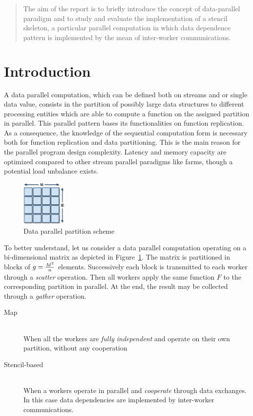 \begin{abstract}
  The aim of the report is to briefly introduce the concept of
  data-parallel paradigm and to study and evaluate the implementation of
  a stencil skeleton, a particular parallel computation in which data
  dependence pattern is implemented by the mean of inter-worker
  communications.
\end{abstract}

\section{Introduction}

A data parallel computation, which can be defined both on streams and or
single data value, consists in the partition of possibly large data
structures to different processing entities which are able to compute
a function on the assigned partition in parallel. This parallel pattern
bases its functionalities on function replication. As a consequence, the
knowledge of the sequential computation form is necessary both for
function replication and data partitioning. This is the main reason for
the parallel program design complexity. Latency and memory capacity are
optimized compared to other stream parallel paradigms like farms, though
a potential load unbalance exists.

\begin{figure}
  \centering
  \includegraphics[width=0.2\textwidth]{imgs/stencil.png}
  \caption{Data parallel partition scheme}
  \label{fig:data-parallel}
\end{figure}


To better understand, let us consider a data parallel computation
operating on a bi-dimensional matrix as depicted in
Figure~\ref{fig:data-parallel}. The matrix is partitioned in blocks of
$g = {M^{2} \over n}$ elements. Successively each block is transmitted
to each worker through a \emph{scatter} operation. Then all workers
apply the same function $F$ to the corresponding partition in parallel.
At the end, the result may be collected through a \emph{gather}
operation.


\begin{description}
  \item[Map]\hfill\\
    {When all the workers are \emph{fully independent} and
    operate on their own partition, without any cooperation}
  \item[Stencil-based]\hfill\\
    {When a workers operate in parallel and
    \emph{cooperate} through data exchanges. In this case data
    dependencies are implemented by inter-worker communications.}
\end{description}

